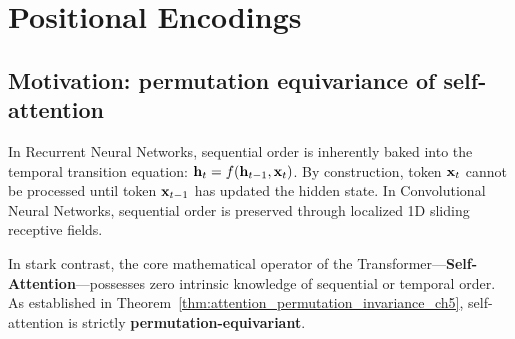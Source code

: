 \documentclass[../../../main.tex]{subfiles}
\begin{document}
\clearpage
\section{Positional Encodings}
\label{sec:positional_representations_taxonomy}

\subsection{Motivation: permutation equivariance of self-attention}
\label{subsec:pe_motivation_permutation}

In Recurrent Neural Networks, sequential order is inherently baked into the temporal transition equation: $\mathbf{h}_t = f(\mathbf{h}_{t-1}, \mathbf{x}_t)$. By construction, token $\mathbf{x}_t$ cannot be processed until token $\mathbf{x}_{t-1}$ has updated the hidden state. In Convolutional Neural Networks, sequential order is preserved through localized 1D sliding receptive fields.

In stark contrast, the core mathematical operator of the Transformer---\textbf{Self-Attention}---possesses zero intrinsic knowledge of sequential or temporal order. As established in Theorem~\ref{thm:attention_permutation_invariance_ch5}, self-attention is strictly \textbf{permutation-equivariant}.
\end{document}
